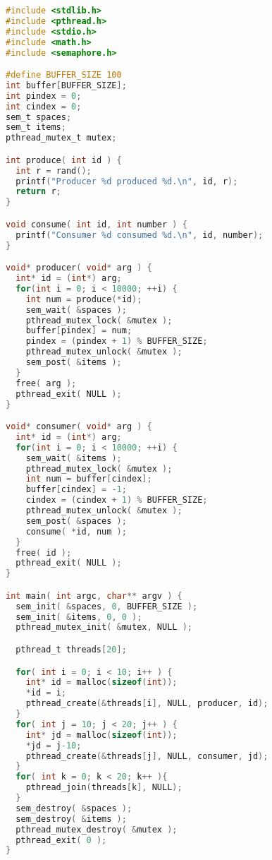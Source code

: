 \begin{lstlisting}[language=C]
#include <stdlib.h>
#include <pthread.h>
#include <stdio.h>
#include <math.h>
#include <semaphore.h>

#define BUFFER_SIZE 100
int buffer[BUFFER_SIZE];
int pindex = 0;
int cindex = 0;
sem_t spaces;
sem_t items;
pthread_mutex_t mutex;

int produce( int id ) {
  int r = rand();
  printf("Producer %d produced %d.\n", id, r);
  return r;
}

void consume( int id, int number ) {
  printf("Consumer %d consumed %d.\n", id, number);
}

void* producer( void* arg ) {
  int* id = (int*) arg;
  for(int i = 0; i < 10000; ++i) {
    int num = produce(*id); 
    sem_wait( &spaces );
    pthread_mutex_lock( &mutex );
    buffer[pindex] = num;
    pindex = (pindex + 1) % BUFFER_SIZE;
    pthread_mutex_unlock( &mutex );
    sem_post( &items );
  }
  free( arg );
  pthread_exit( NULL );
}

void* consumer( void* arg ) {
  int* id = (int*) arg;
  for(int i = 0; i < 10000; ++i) {
    sem_wait( &items );
    pthread_mutex_lock( &mutex );
    int num = buffer[cindex];
    buffer[cindex] = -1;
    cindex = (cindex + 1) % BUFFER_SIZE;
    pthread_mutex_unlock( &mutex );
    sem_post( &spaces );
    consume( *id, num );
  }
  free( id );
  pthread_exit( NULL );
}

int main( int argc, char** argv ) {
  sem_init( &spaces, 0, BUFFER_SIZE );
  sem_init( &items, 0, 0 );  
  pthread_mutex_init( &mutex, NULL );

  pthread_t threads[20];

  for( int i = 0; i < 10; i++ ) {
    int* id = malloc(sizeof(int));
    *id = i;
    pthread_create(&threads[i], NULL, producer, id);
  }
  for( int j = 10; j < 20; j++ ) {
    int* jd = malloc(sizeof(int));
    *jd = j-10;
    pthread_create(&threads[j], NULL, consumer, jd);
  }
  for( int k = 0; k < 20; k++ ){  
    pthread_join(threads[k], NULL);
  }
  sem_destroy( &spaces );
  sem_destroy( &items );
  pthread_mutex_destroy( &mutex );
  pthread_exit( 0 );
}
\end{lstlisting}




